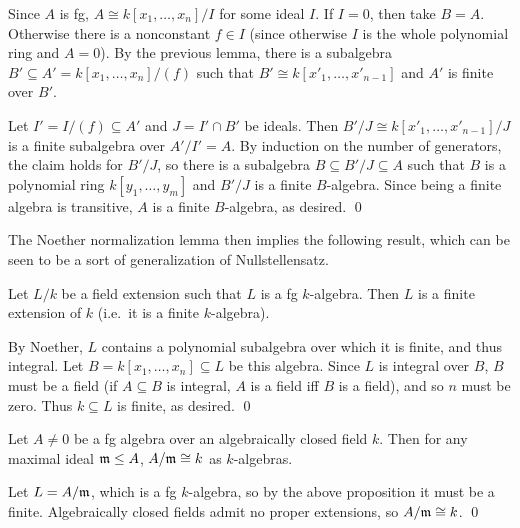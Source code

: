 \ethrm

\bproof

    Since $A$ is fg, $A\cong k[x_1,\dots,x_n]/I$ for some ideal $I$.
    If $I=0$, then take $B=A$.
    Otherwise there is a nonconstant $f\in I$ (since otherwise $I$ is the whole polynomial ring and $A=0$).
    By the previous lemma, there is a subalgebra $B'\subseteq A'=k[x_1,\dots,x_n]/(f)$ such that $B'\cong k[x'_1,\dots,x'_{n-1}]$
    and $A'$ is finite over $B'$.

    Let $I'=I/(f)\subseteq A'$ and $J=I'\cap B'$ be ideals.
    Then $B'/J\cong k[x'_1,\dots,x'_{n-1}]/J$ is a finite subalgebra over $A'/I'=A$.
    By induction on the number of generators, the claim holds for $B'/J$, so there is a subalgebra $B\subseteq B'/J\subseteq A$ such that
    $B$ is a polynomial ring $k[y_1,\dots,y_m]$ and $B'/J$ is a finite $B$-algebra.
    Since being a finite algebra is transitive, $A$ is a finite $B$-algebra, as desired.
    \qed

\eproof

The Noether normalization lemma then implies the following result, which can be seen to be a sort of generalization of Nullstellensatz.

\bprop

    Let $L/k$ be a field extension such that $L$ is a fg $k$-algebra.
    Then $L$ is a finite extension of $k$ (i.e.\ it is a finite $k$-algebra).

\eprop

\bproof

    By Noether, $L$ contains a polynomial subalgebra over which it is finite, and thus integral.
    Let $B=k[x_1,\dots,x_n]\subseteq L$ be this algebra.
    Since $L$ is integral over $B$, $B$ must be a field (if $A\subseteq B$ is integral, $A$ is a field iff $B$ is a field), and so $n$ must be
    zero.
    Thus $k\subseteq L$ is finite, as desired.
    \qed

\eproof

\bcoro[title=Weak Nullstellensatz]

    Let $A\neq0$ be a fg algebra over an algebraically closed field $k$.
    Then for any maximal ideal ${{\frak m}}\leq A$, $A/{{\frak m}}\cong k$ as $k$-algebras.

\ecoro

\bproof

    Let $L=A/{{\frak m}}$, which is a fg $k$-algebra, so by the above proposition it must be a finite.
    Algebraically closed fields admit no proper extensions, so $A/{{\frak m}}\cong k$.
    \qed

